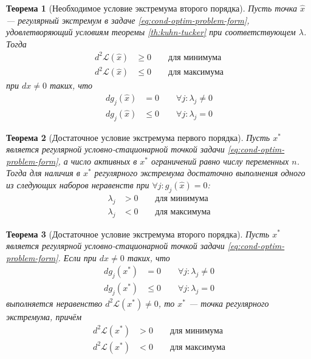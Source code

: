 \documentclass{article}
\renewcommand{\leq}{\leqslant}
\renewcommand{\geq}{\geqslant}
\providecommand{\La}{\mathcal{L}}
\newtheorem{thm}{Теорема}[section]
\theoremstyle{remark}
\theoremstyle{definition}
\numberwithin{equation}{section}
\begin{document}
\begin{thm}[Необходимое условие экстремума второго порядка]
  \label{th:if-extr-2}
  Пусть точка $\hat{x}$ — регулярный экстремум в задаче
  \eqref{eq:cond-optim-problem-form}, удовлетворяющий условиям теоремы
  \ref{th:kuhn-tucker} при соответствующем $\lambda$. Тогда
  \begin{align*}
    d^2\La(\hat{x}) &\geq 0 \qquad \text{для минимума} \\
    d^2\La(\hat{x}) &\leq 0 \qquad \text{для максимума}
  \end{align*}
  при $dx ≠ 0$ таких, что
  \begin{align*}
    dg_j(\hat{x}) &= 0 \qquad \forall j: \lambda_j ≠ 0\\
    dg_j(\hat{x}) &\leq 0 \qquad \forall j: \lambda_j=0
  \end{align*}
\end{thm}

\begin{thm}[Достаточное условие экстремума первого порядка]
  \label{th:then-extr-1}
  Пусть $x^*$ является регулярной условно-стационарной точкой задачи
  \eqref{eq:cond-optim-problem-form}, а число активных в $x^*$
  ограничений равно числу переменных $n$. Тогда для наличия в $x^*$
  регулярного экстремума достаточно выполнения одного из следующих
  наборов неравенств при $\forall j: g_j(\hat{x}) = 0$:
  \begin{align*}
    \lambda_j &> 0 \qquad \text{для минимума} \\
    \lambda_j &< 0 \qquad \text{для максимума}
  \end{align*}
\end{thm}

\begin{thm}[Достаточное условие экстремума второго порядка]
  \label{th:then-extr-2}
  Пусть $x^*$ является регулярной условно-стационарной точкой задачи
  \eqref{eq:cond-optim-problem-form}. Если при $dx ≠ 0$ таких, что
    \begin{align*}
    dg_j(x^*) &= 0 \qquad \forall j: \lambda_j ≠ 0\\
    dg_j(x^*) &\leq 0 \qquad \forall j: \lambda_j=0
  \end{align*}
  выполняется неравенство $d^2\La(x^*) ≠ 0$, то $x^*$ — точка
  регулярного экстремума, причём
  \begin{align*}
    d^2\La(x^*) &> 0 \qquad \text{для минимума} \\
    d^2\La(x^*) &< 0 \qquad \text{для максимума}
  \end{align*}
\end{thm}
\end{document}
